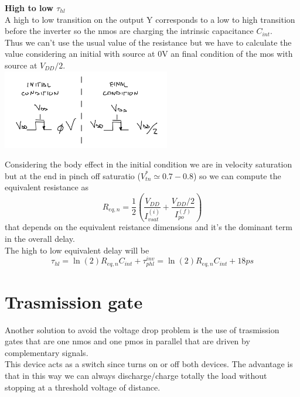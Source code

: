\vspace{7mm}
{\bf High to low $\tau_{hl}$}\\
A high to low transition on the output Y corresponds to a low to high transition before the inverter so the nmos are charging the intrinsic capacitance $C_{int}$.\\
Thus we can't use the usual value of the resistance but we have to calculate the value considering an initial with source at 0V an final condition of the mos with source at $V_{DD}/2$.\\
\vspace{3mm}
\centering
\includegraphics[width=0.55\textwidth]{C8_01.png}\\
\raggedright

Considering the body effect in the initial condition we are in velocity saturation but at the end in pinch off saturatio ($V_{tn}^{*}\simeq0.7-0.8$) so we can compute the equivalent resistance as 
\begin{equation}
R_{eq,n}=\frac{1}{2}\left(\frac{V_{DD}}{I_{vsat}^{(i)}}+\frac{V_{DD}/2}{I_{po}^{(f)}}\right)
\end{equation}
that depends on the equivalent reistance dimensions and it's the dominant term in the overall delay.\\
The high to low equivalent delay will be 
\begin{equation}
\tau_{hl}=\ln(2)R_{eq,n}C_{int}+\tau_{phl}^{inv}=\ln(2)R_{eq,n}C_{int}+18ps
\end{equation}

\section{Trasmission gate}
Another solution to avoid the voltage drop problem is the use of trasmission gates that are one nmos and one pmos in parallel that are driven by complementary signals.\\
This device acts as a switch since turns on or off both devices. The advantage is that in this way we can always discharge/charge totally the load without stopping at a threshold voltage of distance.\\

